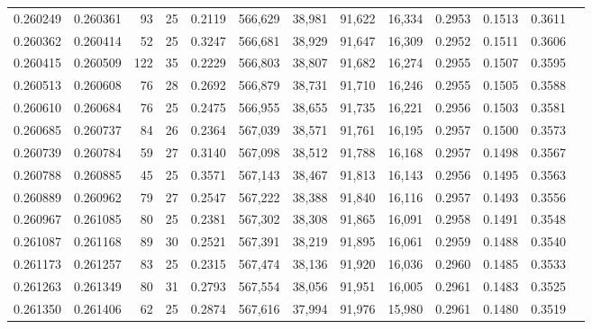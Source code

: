 \begin{tabular}{rrrrrrrrrrrrr}
0.260249 & 0.260361 &  93 &  25 &                                     0.2119 & 566,629 &  38,981 &  91,622 &  16,334 & 0.2953 & 0.1513 & 0.3611 \\
0.260362 & 0.260414 &  52 &  25 &                                     0.3247 & 566,681 &  38,929 &  91,647 &  16,309 & 0.2952 & 0.1511 & 0.3606 \\
0.260415 & 0.260509 & 122 &  35 &                                     0.2229 & 566,803 &  38,807 &  91,682 &  16,274 & 0.2955 & 0.1507 & 0.3595 \\
0.260513 & 0.260608 &  76 &  28 &                                     0.2692 & 566,879 &  38,731 &  91,710 &  16,246 & 0.2955 & 0.1505 & 0.3588 \\
0.260610 & 0.260684 &  76 &  25 &                                     0.2475 & 566,955 &  38,655 &  91,735 &  16,221 & 0.2956 & 0.1503 & 0.3581 \\
0.260685 & 0.260737 &  84 &  26 &                                     0.2364 & 567,039 &  38,571 &  91,761 &  16,195 & 0.2957 & 0.1500 & 0.3573 \\
0.260739 & 0.260784 &  59 &  27 &                                     0.3140 & 567,098 &  38,512 &  91,788 &  16,168 & 0.2957 & 0.1498 & 0.3567 \\
0.260788 & 0.260885 &  45 &  25 &                                     0.3571 & 567,143 &  38,467 &  91,813 &  16,143 & 0.2956 & 0.1495 & 0.3563 \\
0.260889 & 0.260962 &  79 &  27 &                                     0.2547 & 567,222 &  38,388 &  91,840 &  16,116 & 0.2957 & 0.1493 & 0.3556 \\
0.260967 & 0.261085 &  80 &  25 &                                     0.2381 & 567,302 &  38,308 &  91,865 &  16,091 & 0.2958 & 0.1491 & 0.3548 \\
0.261087 & 0.261168 &  89 &  30 &                                     0.2521 & 567,391 &  38,219 &  91,895 &  16,061 & 0.2959 & 0.1488 & 0.3540 \\
0.261173 & 0.261257 &  83 &  25 &                                     0.2315 & 567,474 &  38,136 &  91,920 &  16,036 & 0.2960 & 0.1485 & 0.3533 \\
0.261263 & 0.261349 &  80 &  31 &                                     0.2793 & 567,554 &  38,056 &  91,951 &  16,005 & 0.2961 & 0.1483 & 0.3525 \\
0.261350 & 0.261406 &  62 &  25 &                                     0.2874 & 567,616 &  37,994 &  91,976 &  15,980 & 0.2961 & 0.1480 & 0.3519 \\

\end{tabular}
